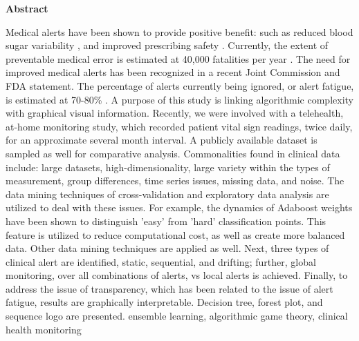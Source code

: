 \documentclass[12pt]{article}
\begin{document}
\begin{center}
    {\bf Abstract}\\
\end{center}
\noindent
Medical alerts have been shown to provide positive benefit: such as reduced blood sugar variability \cite{Mastro}, and improved prescribing safety \cite{Raebel}.  Currently, the extent of preventable medical error is estimated at 40,000 fatalities per year \cite{Muse}.  The need for improved medical alerts has been recognized in a recent Joint Commission and FDA statement.  The percentage of alerts currently being ignored, or alert fatigue, is estimated at 70-80\% \cite{Gouveia}.  A purpose of this study is linking algorithmic complexity with graphical visual information.  Recently, we were involved with a telehealth, at-home monitoring study, which recorded patient vital sign readings, twice daily, for an approximate several month interval.  A publicly available dataset is sampled as well for comparative analysis.  Commonalities found in clinical data include: large datasets, high-dimensionality, large variety within the types of measurement, group differences, time series issues, missing data, and noise.  The data mining techniques of cross-validation and exploratory data analysis are utilized to deal with these issues.  For example, the dynamics of Adaboost weights have been shown to distinguish 'easy' from 'hard' classification points\cite{Capri2002}.  This feature is utilized to reduce computational cost, as well as create more balanced data.  Other data mining techniques are applied as well.  Next, three types of clinical alert are identified, static, sequential, and drifting; further, global monitoring, over all combinations of alerts, vs local alerts is achieved.  Finally, to address the issue of transparency, which has been related to the issue of alert fatigue, results are graphically interpretable.  Decision tree, forest plot, and sequence logo are presented.
ensemble learning, algorithmic game theory, clinical health monitoring
\end{document}

